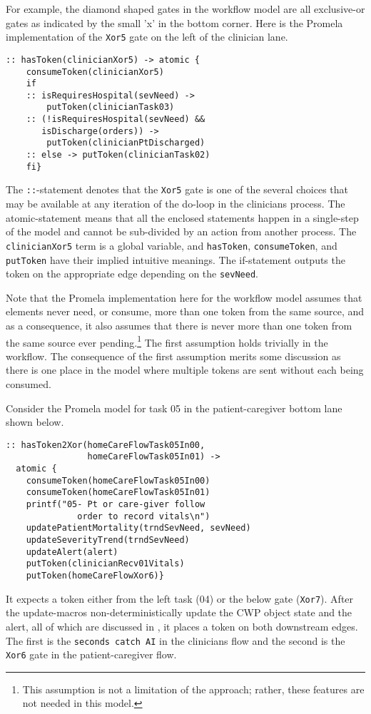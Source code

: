 For example, the diamond shaped gates in the workflow model are all exclusive-or gates as indicated by the small 'x' in the bottom corner.
Here is the Promela implementation of the \texttt{Xor5} gate on the left of the clinician lane.
%
{\small
\begin{lstlisting}[style=myPromela]
:: hasToken(clinicianXor5) -> atomic { 
    consumeToken(clinicianXor5)
    if
    :: isRequiresHospital(sevNeed) -> 
        putToken(clinicianTask03)
    :: (!isRequiresHospital(sevNeed) && 
       isDischarge(orders)) -> 
        putToken(clinicianPtDischarged)
    :: else -> putToken(clinicianTask02)
    fi}
\end{lstlisting}
}
% 
\noindent The \texttt{::}-statement denotes that the \texttt{Xor5} gate is one of the several choices that may be available at any iteration of the do-loop in the clinicians process.
The atomic-statement means that all the enclosed statements happen in a single-step of the model and cannot be sub-divided by an action from another process.
The \texttt{clinicianXor5} term is a global variable, and \texttt{hasToken}, \texttt{consumeToken}, and \texttt{putToken} have their implied intuitive meanings.
The if-statement outputs the token on the appropriate edge depending on the \texttt{sevNeed}.

Note that the Promela implementation here for the workflow model assumes that elements never need, or consume, more than one token from the same source, and as a consequence, it also assumes that there is never more than one token from the same source ever pending.\footnote{This assumption is not a limitation of the approach; rather, these features are not needed in this model.}
The first assumption holds trivially in the workflow.
The consequence of the first assumption merits some discussion as there is one place in the model where multiple tokens are sent without each being consumed.

Consider the Promela model for task 05 in the patient-caregiver bottom lane shown below.
%
{\small
\begin{lstlisting}[style=myPromela]
:: hasToken2Xor(homeCareFlowTask05In00, 
                homeCareFlowTask05In01) -> 
  atomic {
    consumeToken(homeCareFlowTask05In00)
    consumeToken(homeCareFlowTask05In01)
    printf("05- Pt or care-giver follow 
              order to record vitals\n")
    updatePatientMortality(trndSevNeed, sevNeed)
    updateSeverityTrend(trndSevNeed)
    updateAlert(alert)
    putToken(clinicianRecv01Vitals)
    putToken(homeCareFlowXor6)}
\end{lstlisting}
}
%
\noindent It expects a token either from the left task (04) or the below gate (\texttt{Xor7}).
After the update-macros non-deterministically update the CWP object state and the alert, all of which are discussed in , it places a token on both downstream edges.
The first is the \texttt{seconds catch AI} in the clinicians flow and the second is the \texttt{Xor6} gate in the patient-caregiver flow. 


